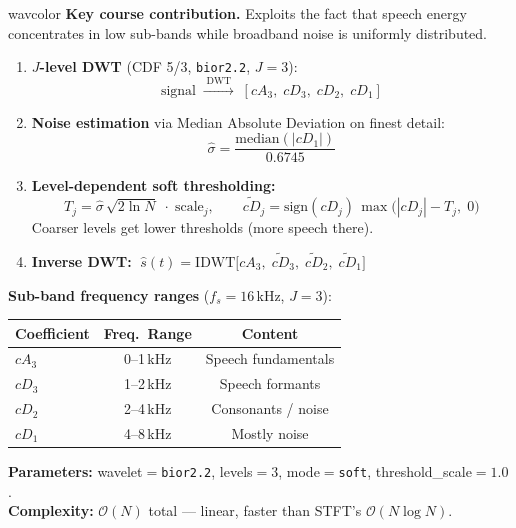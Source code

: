 \documentclass[11pt,a4paper]{article}
\begin{document}
\begin{modulebox}{wavcolor}
\textbf{Key course contribution.} Exploits the fact that speech energy concentrates in low sub-bands while broadband noise is uniformly distributed.

\begin{enumerate}[nosep]
\item \textbf{$J$-level DWT} (CDF 5/3, \texttt{bior2.2}, $J\!=\!3$):
\[
\text{signal} \;\xrightarrow{\;\text{DWT}\;}\; [cA_3,\; cD_3,\; cD_2,\; cD_1]
\]
\item \textbf{Noise estimation} via Median Absolute Deviation on finest detail:
\begin{equation}
\hat{\sigma} = \frac{\text{median}(|cD_1|)}{0.6745}
\end{equation}
\item \textbf{Level-dependent soft thresholding:}
\begin{equation}
T_j = \hat{\sigma}\,\sqrt{2\ln N}\;\cdot\;\text{scale}_j, \qquad
\widetilde{cD}_j = \text{sign}(cD_j)\,\max\!\big(|cD_j| - T_j,\;0\big)
\end{equation}
Coarser levels get lower thresholds (more speech there).
\item \textbf{Inverse DWT:}
$\;\hat{s}(t) = \text{IDWT}\big[cA_3,\;\widetilde{cD}_3,\;\widetilde{cD}_2,\;\widetilde{cD}_1\big]$
\end{enumerate}

\noindent\textbf{Sub-band frequency ranges} ($f_s = 16$\,kHz, $J=3$):

\smallskip
\begin{center}
\begin{tabular}{lcc}
\toprule
\textbf{Coefficient} & \textbf{Freq.\ Range} & \textbf{Content}\\
\midrule
$cA_3$ & 0--1\,kHz & Speech fundamentals\\
$cD_3$ & 1--2\,kHz & Speech formants\\
$cD_2$ & 2--4\,kHz & Consonants / noise\\
$cD_1$ & 4--8\,kHz & Mostly noise\\
\bottomrule
\end{tabular}
\end{center}

\noindent\textbf{Parameters:} wavelet$=$\texttt{bior2.2}, levels$=3$, mode$=$\texttt{soft}, threshold\_scale$=1.0$.\\
\textbf{Complexity:} $\mathcal{O}(N)$ total --- linear, faster than STFT's $\mathcal{O}(N\log N)$.
\end{modulebox}
\end{document}
